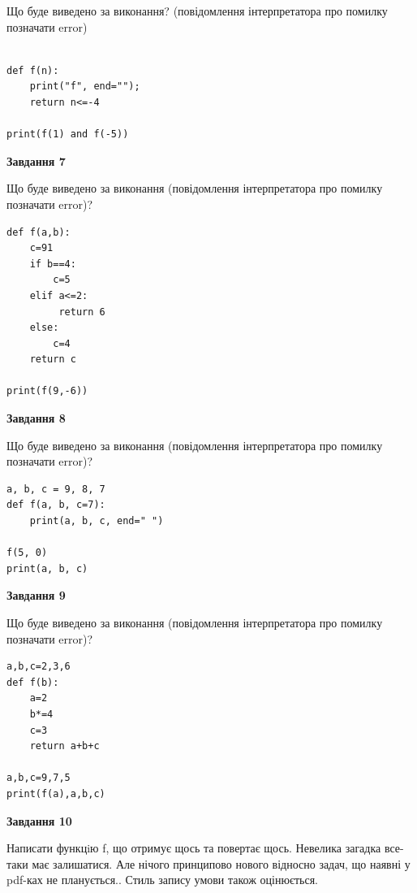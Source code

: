 \documentclass[12pt, ukrainian]{article}
\begin{document}
{\begin {large}
Що буде виведено за виконання? (повідомлення інтерпретатора про помилку позначати error)\par
\begin{verbatim}

def f(n):
    print("f", end="");
    return n<=-4

print(f(1) and f(-5))
\end{verbatim}

{\begin {center}\textbf{Завдання 7}\end {center}}

Що буде виведено за виконання (повідомлення інтерпретатора про помилку позначати error)?\par
\begin{verbatim}
def f(a,b):
    c=91
    if b==4:
        c=5
    elif a<=2:
         return 6
    else: 
        c=4
    return c

print(f(9,-6))
\end{verbatim}

{\begin {center}\textbf{Завдання 8}\end {center}}

Що буде виведено за виконання (повідомлення інтерпретатора про помилку позначати error)?\par
\begin{verbatim}
a, b, c = 9, 8, 7
def f(a, b, c=7):
    print(a, b, c, end=" ")

f(5, 0)
print(a, b, c)
\end{verbatim}

{\begin {center}\textbf{Завдання 9}\end {center}}

Що буде виведено за виконання (повідомлення інтерпретатора про помилку позначати error)?\par
\begin{verbatim}
a,b,c=2,3,6
def f(b):
    a=2
    b*=4
    c=3
    return a+b+c

a,b,c=9,7,5
print(f(a),a,b,c)
\end{verbatim}

{\begin {center}\textbf{Завдання 10}\end {center}}


Написати функцiю f, що отримує щось та повертає щось. Невелика загадка все-таки має залишатися. Але нічого принципово нового відносно задач, що наявні у pdf-ках не планується.. Стиль запису умови також оцінюється.\par
\end {large}}
\newpage
\end{document}
